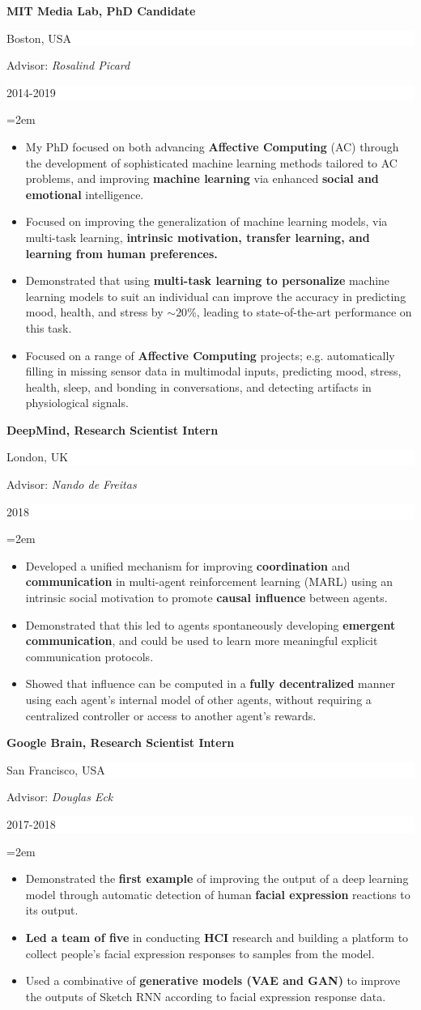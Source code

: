\documentclass[paper=letter,fontsize=11pt]{scrartcl} %
\newcommand{\sepspace}{\vspace*{1em}}       %
\newcommand{\ResearchEntry}[5]{
        \noindent \textbf{#1} \hfill      %
        \colorbox{White}{%
            \parbox{10em}{%
            \hfill\color{Black}#2}} \par  %
        \noindent Advisor: \textit{#3} \hfill      %
        \colorbox{White}{%
            \parbox{6em}{%
            \hfill\color{Black}#4}} \par  %
        \noindent\hangindent=2em\hangafter=0 \small #5 %
        \normalsize \par}
\begin{document}
\ResearchEntry{MIT Media Lab, PhD Candidate}{Boston, USA}{Rosalind Picard}{2014-2019}
{\begin{itemize}
    \item My PhD focused on both advancing \textbf{Affective Computing} (AC) through the development of sophisticated machine learning methods tailored to AC problems, and improving \textbf{machine learning} via enhanced \textbf{social and emotional} intelligence. 
    \item Focused on improving the generalization of machine learning models, via multi-task learning, \textbf{intrinsic motivation, transfer learning, and learning from human preferences.}
    \item Demonstrated that using \textbf{multi-task learning to personalize} machine learning models to suit an individual can improve the accuracy in predicting mood, health, and stress by $\sim20$\%, leading to state-of-the-art performance on this task.
    \item Focused on a range of \textbf{Affective Computing} projects; e.g. automatically filling in missing sensor data in multimodal inputs, predicting mood, stress, health, sleep, and bonding in conversations, and detecting artifacts in physiological signals.
\end{itemize}}
\sepspace

\ResearchEntry{DeepMind, Research Scientist Intern}{London, UK}{Nando de Freitas}{2018}
{\begin{itemize}
    \item Developed a unified mechanism for improving \textbf{coordination} and \textbf{communication} in multi-agent reinforcement learning (MARL) using an intrinsic social motivation to promote \textbf{causal influence} between agents.
    \item Demonstrated that this led to agents spontaneously developing \textbf{emergent communication}, and could be used to learn more meaningful explicit communication protocols. 
    \item Showed that influence can be computed in a \textbf{fully decentralized} manner using each agent's internal model of other agents, without requiring a centralized controller or access to another agent's rewards.
\end{itemize}}
\sepspace

\ResearchEntry{Google Brain, Research Scientist Intern}{San Francisco, USA}{Douglas Eck}{2017-2018}
{\begin{itemize}
    \item Demonstrated the \textbf{first example} of improving the output of a deep learning model through automatic detection of human \textbf{facial expression} reactions to its output.
    \item \textbf{Led a team of five} in conducting \textbf{HCI} research and building a platform to collect people's facial expression responses to samples from the model. 
    \item Used a combinative of \textbf{generative models (VAE and GAN)} to improve the outputs of Sketch RNN according to facial expression response data. 
\end{itemize}}
\sepspace
\end{document}

